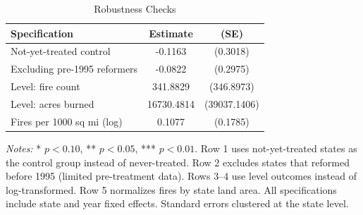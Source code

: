 \begin{table}[H]
\centering
\caption{Robustness Checks}
\label{tab:robustness}
\begin{threeparttable}
\begin{tabular}{l cc}
\toprule
Specification & Estimate & (SE) \\
\midrule
Not-yet-treated control & -0.1163 & (0.3018) \\
Excluding pre-1995 reformers & -0.0822 & (0.2975) \\
Level: fire count & 341.8829 & (346.8973) \\
Level: acres burned & 16730.4814 & (39037.1406) \\
Fires per 1000 sq mi (log) & 0.1077 & (0.1785) \\
\bottomrule
\end{tabular}
\begin{tablenotes}[flushleft]
\small
\item \textit{Notes:} * $p<0.10$, ** $p<0.05$, *** $p<0.01$. Row 1 uses not-yet-treated states as the control group instead of never-treated. Row 2 excludes states that reformed before 1995 (limited pre-treatment data). Rows 3--4 use level outcomes instead of log-transformed. Row 5 normalizes fires by state land area. All specifications include state and year fixed effects. Standard errors clustered at the state level.
\end{tablenotes}
\end{threeparttable}
\end{table}
